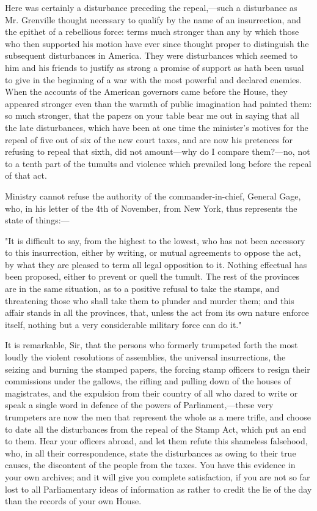 Here was certainly a disturbance preceding the repeal,—such a disturbance as Mr. Grenville thought necessary to qualify by the name of an insurrection, and the epithet of a rebellious force: terms much stronger than any by which those who then supported his motion have ever since thought proper to distinguish the subsequent disturbances in America. They were disturbances which seemed to him and his friends to justify as strong a promise of support as hath been usual to give in the beginning of a war with the most powerful and declared enemies. When the accounts of the American governors came before the House, they appeared stronger even than the warmth of public imagination had painted them: so much stronger, that the papers on your table bear me out in saying that all the late disturbances, which have been at one time the minister's motives for the repeal of five out of six of the new court taxes, and are now his pretences for refusing to repeal that sixth, did not amount—why do I compare them?—no, not to a tenth part of the tumults and violence which prevailed long before the repeal of that act.

Ministry cannot refuse the authority of the commander-in-chief, General Gage, who, in his letter of the 4th of November, from New York, thus represents the state of things:—

"It is difficult to say, from the highest to the lowest, who has not been accessory to this insurrection, either by writing, or mutual agreements to oppose the act, by what they are pleased to term all legal opposition to it. Nothing effectual has been proposed, either to prevent or quell the tumult. The rest of the provinces are in the same situation, as to a positive refusal to take the stamps, and threatening those who shall take them to plunder and murder them; and this affair stands in all the provinces, that, unless the act from its own nature enforce itself, nothing but a very considerable military force can do it."

It is remarkable, Sir, that the persons who formerly trumpeted forth the most loudly the violent resolutions of assemblies, the universal insurrections, the seizing and burning the stamped papers, the forcing stamp officers to resign their commissions under the gallows, the rifling and pulling down of the houses of magistrates, and the expulsion from their country of all who dared to write or speak a single word in defence of the powers of Parliament,—these very trumpeters are now the men that represent the whole as a mere trifle, and choose to date all the disturbances from the repeal of the Stamp Act, which put an end to them. Hear your officers abroad, and let them refute this shameless falsehood, who, in all their correspondence, state the disturbances as owing to their true causes, the discontent of the people from the taxes. You have this evidence in your own archives; and it will give you complete satisfaction, if you are not so far lost to all Parliamentary ideas of information as rather to credit the lie of the day than the records of your own House.

